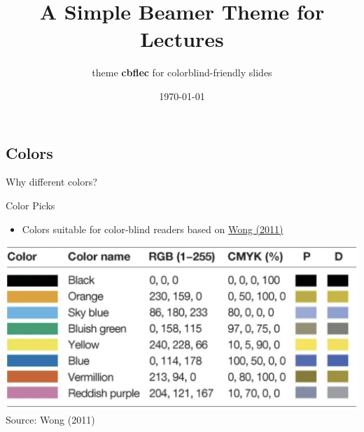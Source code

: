\documentclass[11pt, aspectratio=43]{beamer}
\title{A Simple Beamer Theme for Lectures}
\subtitle{theme \textbf{cbflec} for colorblind-friendly slides}
\date{\today}
\begin{document}
\section{\inserttitle}
\begin{frame}[plain] %
    \titlepage
\end{frame}

\subsection{Colors}
\begin{tframe}
    Why different colors?
\end{tframe}

\begin{frame}{Color Picks}
    \begin{itemize}
        \item Colors suitable for color-blind readers based on \href{https://www.nature.com/articles/nmeth.1618}{Wong (2011)}
    \end{itemize}
    \vspace{1ex}
    \begin{minipage}{\textwidth}
        \centering
        \includegraphics[scale=0.4]{cbf_colors.png}\\
        \footnotesize Source: Wong (2011)
    \end{minipage}
\end{frame}
\end{document}
